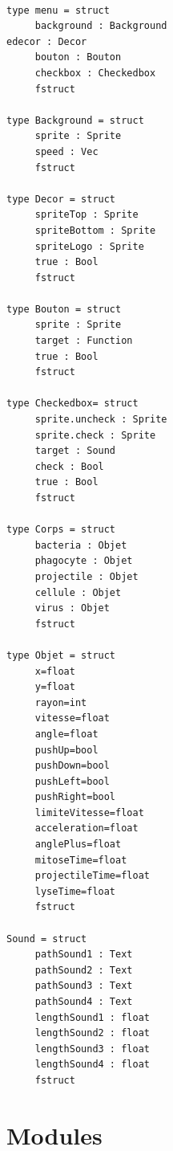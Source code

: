 \documentclass{article}
\begin{document}
\begin{verbatim}
	
type menu = struct
     background : Background
edecor : Decor
     bouton : Bouton
     checkbox : Checkedbox
     fstruct          

type Background = struct
     sprite : Sprite
     speed : Vec
     fstruct

type Decor = struct
     spriteTop : Sprite
     spriteBottom : Sprite
     spriteLogo : Sprite
     true : Bool
     fstruct

type Bouton = struct
     sprite : Sprite
     target : Function
     true : Bool
     fstruct

type Checkedbox= struct
     sprite.uncheck : Sprite
     sprite.check : Sprite
     target : Sound
     check : Bool
     true : Bool
     fstruct

type Corps = struct
     bacteria : Objet
     phagocyte : Objet
     projectile : Objet
     cellule : Objet
     virus : Objet
     fstruct

type Objet = struct
     x=float
     y=float
     rayon=int
     vitesse=float
     angle=float
     pushUp=bool
     pushDown=bool
     pushLeft=bool
     pushRight=bool
     limiteVitesse=float
     acceleration=float
     anglePlus=float
     mitoseTime=float
     projectileTime=float
     lyseTime=float
     fstruct

Sound = struct
     pathSound1 : Text
     pathSound2 : Text
     pathSound3 : Text
     pathSound4 : Text
     lengthSound1 : float
     lengthSound2 : float
     lengthSound3 : float
     lengthSound4 : float
     fstruct

\end{verbatim}
\newpage
\section{Modules}
\end{document}
